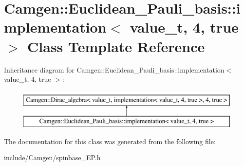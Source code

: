 \hypertarget{a00303}{}\section{Camgen\+:\+:Euclidean\+\_\+\+Pauli\+\_\+basis\+:\+:implementation$<$ value\+\_\+t, 4, true $>$ Class Template Reference}
\label{a00303}
Inheritance diagram for Camgen\+:\+:Euclidean\+\_\+\+Pauli\+\_\+basis\+:\+:implementation$<$ value\+\_\+t, 4, true $>$\+:\begin{figure}[H]
\begin{center}
\leavevmode
\includegraphics[height=2.000000cm]{a00303}
\end{center}
\end{figure}


The documentation for this class was generated from the following file\+:\begin{DoxyCompactItemize}
\item 
include/\+Camgen/spinbase\+\_\+\+E\+P.\+h\end{DoxyCompactItemize}
